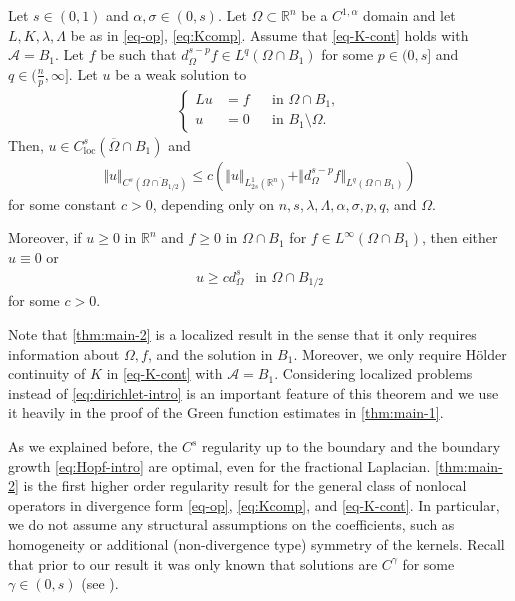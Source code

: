 \documentclass[11pt,reqno]{amsart}
\theoremstyle{plain}
\theoremstyle{definition}
\numberwithin{equation}{section}
\newcommand{\R}{\mathbb{R}}
\newcommand{\1}{\mathbbm{1}}
\begin{document}
\begin{theorem}
\label{thm:main-2}
    Let $s \in (0,1)$ and $\alpha,\sigma \in (0,s)$. Let $\Omega \subset \R^n$ be a $C^{1,\alpha}$ domain and let $L,K, \lambda, \Lambda$ be as in \eqref{eq-op}, \eqref{eq:Kcomp}. Assume that \eqref{eq-K-cont} holds with $\mathcal{A} = B_1$. Let $f$ be such that $d_{\Omega}^{s-p} f \in L^q(\Omega \cap B_1)$ for some $p \in (0,s]$ and $q \in (\frac{n}{p},\infty]$. Let $u$ be a weak solution to
    \begin{align*}
    \left\{
    \begin{aligned}
    Lu&=f &&\text{in }\Omega \cap B_1, \\
    u&=0 &&\text{in } B_1 \setminus \Omega.
    \end{aligned}
    \right.
    \end{align*}
    Then, $u \in C^s_{\mathrm{loc}}(\overline{\Omega} \cap B_{1})$ and
    \begin{align*}
        \Vert u \Vert_{C^s(\overline{\Omega \cap B_{1/2}})} \le c \left( \Vert u \Vert_{L^1_{2s}(\R^n)} + \Vert d^{s-p}_{\Omega} f \Vert_{L^q(\Omega \cap B_1)} \right)
    \end{align*}
    for some constant $c > 0$, depending only on $n,s,\lambda,\Lambda,\alpha,\sigma,p,q$, and $\Omega$.

    Moreover, if $u \ge 0$ in $\R^n$ and $f \ge 0$ in $\Omega \cap B_1$ for $f \in L^\infty(\Omega \cap B_1)$, then either $u \equiv 0$ or 
    \begin{align}
    \label{eq:Hopf-intro}
        u \ge c d^s_{\Omega} ~~ \text{ in } \Omega \cap B_{1/2}
    \end{align}
    for some $c > 0$.
\end{theorem}

Note that \autoref{thm:main-2} is a localized result in the sense that it only requires information about $\Omega,f$, and the solution in $B_1$. Moreover, we only require H\"older continuity of $K$ in \eqref{eq-K-cont} with $\mathcal{A} = B_1$. Considering localized problems instead of \eqref{eq:dirichlet-intro} is an important feature of this theorem and we use it heavily in the proof of the Green function estimates in \autoref{thm:main-1}.

As we explained before, the $C^s$ regularity up to the boundary and the boundary growth \eqref{eq:Hopf-intro} are optimal, even for the fractional Laplacian. \autoref{thm:main-2} is the first higher order regularity result for the general class of nonlocal operators in divergence form \eqref{eq-op}, \eqref{eq:Kcomp}, and \eqref{eq-K-cont}. In particular, we do not assume any structural assumptions on the coefficients, such as homogeneity or additional (non-divergence type) symmetry of the kernels. Recall that prior to our result it was only known that solutions are $C^{\gamma}$ for some $\gamma \in (0,s)$ (see \cite{KKP16,KiLe23}). 
\end{document}
